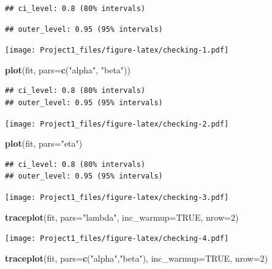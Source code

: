 \documentclass[
]{article}
\newenvironment{Shaded}{\begin{snugshade}}{\end{snugshade}}
\newcommand{\DataTypeTok}[1]{\textcolor[rgb]{0.13,0.29,0.53}{#1}}
\newcommand{\DecValTok}[1]{\textcolor[rgb]{0.00,0.00,0.81}{#1}}
\newcommand{\KeywordTok}[1]{\textcolor[rgb]{0.13,0.29,0.53}{\textbf{#1}}}
\newcommand{\NormalTok}[1]{#1}
\newcommand{\OtherTok}[1]{\textcolor[rgb]{0.56,0.35,0.01}{#1}}
\newcommand{\StringTok}[1]{\textcolor[rgb]{0.31,0.60,0.02}{#1}}
\begin{document}
\begin{verbatim}
## ci_level: 0.8 (80% intervals)
\end{verbatim}

\begin{verbatim}
## outer_level: 0.95 (95% intervals)
\end{verbatim}

\texttt{[image: Project1\_files/figure-latex/checking-1.pdf]}

\begin{Shaded}
\begin{Highlighting}[]
\KeywordTok{plot}\NormalTok{(fit, }\DataTypeTok{pars=}\KeywordTok{c}\NormalTok{(}\StringTok{"alpha"}\NormalTok{, }\StringTok{"beta"}\NormalTok{))}
\end{Highlighting}
\end{Shaded}

\begin{verbatim}
## ci_level: 0.8 (80% intervals)
## outer_level: 0.95 (95% intervals)
\end{verbatim}

\texttt{[image: Project1\_files/figure-latex/checking-2.pdf]}

\begin{Shaded}
\begin{Highlighting}[]
\KeywordTok{plot}\NormalTok{(fit, }\DataTypeTok{pars=}\StringTok{"eta"}\NormalTok{)}
\end{Highlighting}
\end{Shaded}

\begin{verbatim}
## ci_level: 0.8 (80% intervals)
## outer_level: 0.95 (95% intervals)
\end{verbatim}

\texttt{[image: Project1\_files/figure-latex/checking-3.pdf]}

\begin{Shaded}
\begin{Highlighting}[]
\KeywordTok{traceplot}\NormalTok{(fit, }\DataTypeTok{pars=}\StringTok{"lambda"}\NormalTok{, }\DataTypeTok{inc_warmup=}\OtherTok{TRUE}\NormalTok{, }\DataTypeTok{nrow=}\DecValTok{2}\NormalTok{)}
\end{Highlighting}
\end{Shaded}

\texttt{[image: Project1\_files/figure-latex/checking-4.pdf]}

\begin{Shaded}
\begin{Highlighting}[]
\KeywordTok{traceplot}\NormalTok{(fit, }\DataTypeTok{pars=}\KeywordTok{c}\NormalTok{(}\StringTok{"alpha"}\NormalTok{,}\StringTok{"beta"}\NormalTok{), }\DataTypeTok{inc_warmup=}\OtherTok{TRUE}\NormalTok{, }\DataTypeTok{nrow=}\DecValTok{2}\NormalTok{)}
\end{Highlighting}
\end{Shaded}
\end{document}
